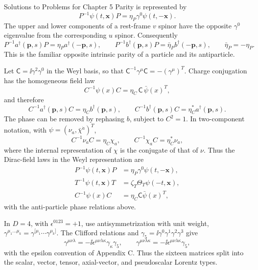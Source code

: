 \begin{bankssolutions}{Solutions to Problems for Chapter 5}
Parity is represented by
\begin{equation*}
 P^{-1}\psi(t,\mathbf x)P=\eta_P\gamma^0\psi(t,-\mathbf x).
\end{equation*}
The upper and lower components of a rest-frame $v$ spinor have the opposite
$\gamma^0$ eigenvalue from the corresponding $u$ spinor. Consequently
\begin{equation*}
 P^{-1}a^\dagger(\mathbf p,s)P=\eta_Pa^\dagger(-\mathbf p,s),
 \qquad
 P^{-1}b^\dagger(\mathbf p,s)P=\bar\eta_Pb^\dagger(-\mathbf p,s),
 \qquad
 \bar\eta_P=-\eta_P.
\end{equation*}
This is the familiar opposite intrinsic parity of a particle and its
antiparticle.

Let $\mathsf C=\ii\gamma^2\gamma^0$ in the Weyl basis, so that
$\mathsf C^{-1}\gamma^\mu\mathsf C=-(\gamma^\mu)^T$. Charge conjugation has
the homogeneous field law
\begin{equation*}
 C^{-1}\psi(x)C=\eta_C\,\mathsf C\,\bar\psi(x)^T,
\end{equation*}
and therefore
\begin{equation*}
  C^{-1}a^\dagger(\mathbf p,s)C=\eta_C b^\dagger(\mathbf p,s),
 \qquad
  C^{-1}b^\dagger(\mathbf p,s)C=\eta_C^*a^\dagger(\mathbf p,s).
\end{equation*}
The phase can be removed by rephasing $b$, subject to $C^2=1$. In two-component
notation, with $\psi=(\nu_a,\bar\chi^{\dot a})^T$,
\begin{equation*}
 C^{-1}\nu_aC=\eta_C\chi_a,
 \qquad
 C^{-1}\chi_aC=\eta_C^*\nu_a,
\end{equation*}
where the internal representation of $\chi$ is the conjugate of that of $\nu$.
Thus the Dirac-field laws in the Weyl representation are
\begin{align*}
 P^{-1}\psi(t,\mathbf x)P&=\eta_P\gamma^0\psi(t,-\mathbf x),\\
 T^{-1}\psi(t,\mathbf x)T&=\zeta_T\Theta_T\psi(-t,\mathbf x),\\
 C^{-1}\psi(x)C&=\eta_C\mathsf C\bar\psi(x)^T,
\end{align*}
with the anti-particle phase relations above.

In $D=4$, with $\epsilon^{0123}=+1$, use antisymmetrization with unit weight,
$\gamma^{\mu_1\ldots\mu_k}=\gamma^{[\mu_1}\cdots\gamma^{\mu_k]}$. The Clifford
relations and $\gamma_5=\ii\gamma^0\gamma^1\gamma^2\gamma^3$ give
\begin{equation*}
 \gamma^{\mu\nu\lambda}=-\ii\epsilon^{\mu\nu\lambda\kappa}\gamma_\kappa\gamma_5,
 \qquad
 \gamma^{\mu\nu\lambda\kappa}=-\ii\epsilon^{\mu\nu\lambda\kappa}\gamma_5,
\end{equation*}
with the epsilon convention of Appendix C. Thus the sixteen matrices split into
the scalar, vector, tensor, axial-vector, and pseudoscalar Lorentz types.


\end{bankssolutions}

